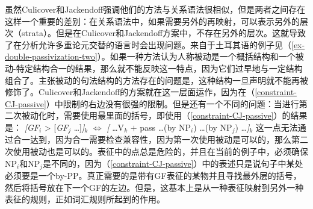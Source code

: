 \begin{exe}
\begin{xlist}[iv.]
\begin{exe}
\begin{xlist}[iv.]
虽然Culicover和Jackendoff强调他们的方法与关系语法\citep{Perlmutter83a-ed}很相似，但是两者之间存在这样一个重要的差别：在关系语法中，如果需要另外的再映射，可以表示另外的层次（strata）。但是在Culicover和Jackendoff方案中，不存在另外的层次。这就导致了在分析允许多重论元交替的语言时会出现问题。来自于土耳其语的例子见（\ref{ex-double-passivization-two}）。如果一种方法认为人称被动是一个概括结构和一个被动-特定结构合一的结果，那么就不能反映这一特点，因为它们过早地与一定结构组合了。主张被动的句法结构的方法存在的问题是，这种结构一旦声明就不能再被修饰了。Culicover和Jackendoff的方案就在这一层面运作，因为在（\ref{constraint-CJ-passive}）中限制的右边没有很强的限制。但是还有一个不同的问题：当进行第二次被动化时，需要使用最里面的括号，即使用（\ref{constraint-CJ-passive}）的结果是：
\ea
{}\emph{[GF}$_i$ > [\emph{GF}$_j$ \ldots]\emph{]}$_k$ $\Leftrightarrow$ \emph{[} \ldots V$_k$ $+$ pass \ldots (by NP$_i$) \ldots (by NP$_j$) \ldots\emph{]}$_k$
\z
这一点无法通过合一达到，因为合一需要检查兼容性，因为第一次使用被动是可以的，那么第二次使用被动也是可以的。表征中的点总是危险的，并且在当前的例子中，必须确保NP$_i$和NP$_j$是不同的，因为（\ref{constraint-CJ-passive}）中的表述只是说句子中某处必须要是一个by-PP。真正需要的是带有GF表征的某物并且寻找最外层的括号，然后将括号放在下一个GF的左边。但是，这基本上是从一种表征映射到另外一种表征的规则，正如词汇规则所起到的作用。

\end{xlist}
\end{exe}
\end{xlist}
\end{exe}
